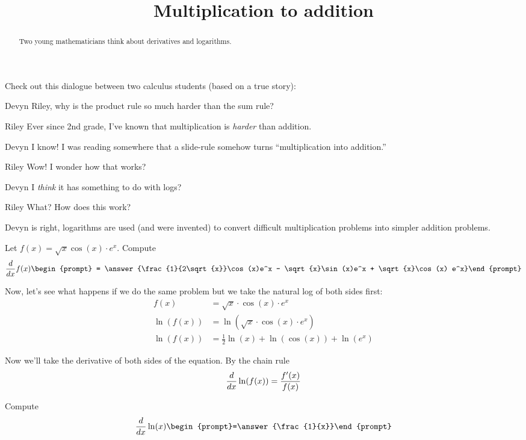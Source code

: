 \documentclass{ximera}
\title[Break-Ground:]{Multiplication to addition}
\begin{document}
\begin{abstract}
Two young mathematicians think about derivatives and logarithms.
\end{abstract}
\maketitle


Check out this dialogue between two calculus students (based on a true
story):

\begin{dialogue}
\item[Devyn] Riley, why is the product rule so much harder than the sum rule?
\item[Riley] Ever since 2nd grade, I've known that multiplication is
  \textit{harder} than addition.
\item[Devyn] I know! I was reading somewhere that a slide-rule somehow
  turns ``multiplication into addition.''
\item[Riley] Wow! I wonder how that works?
\item[Devyn] I \textit{think} it has something to do with logs?
\item[Riley] What? How does this work?
\end{dialogue}

Devyn is right, logarithms are used (and were invented) to convert
difficult multiplication problems into simpler addition problems.

\begin{problem}
  Let $f(x) =  \sqrt{x} \cos(x) \cdot e^x$. Compute
  \[
  \ddx f(x)\begin{prompt} = \answer{\frac{1}{2\sqrt{x}}\cos(x)e^x -  \sqrt{x}\sin(x)e^x +  \sqrt{x}\cos(x) e^x}\end{prompt}
  \]
\end{problem}

Now, let's see what happens if we do the same problem but we take the
natural log of both sides first:
\begin{align*}
  f(x) &= \sqrt{x}\cdot\cos(x)\cdot e^x\\
  \ln(f(x)) &= \ln( \sqrt{x}\cdot\cos(x)\cdot e^x)\\
  \ln(f(x)) &=\frac{1}{2}\ln{(x)} + \ln(\cos(x)) + \ln(e^x)
\end{align*}

Now we'll take the derivative of both sides of the equation.
By the chain rule
\[
\frac{d}{\mathop{}\!d x} \ln(f(x))= \frac{f'(x)}{f(x)}
\]


\begin{problem}
  Compute %
  \[
  \ddx \ln(x)  \begin{prompt}=\answer{\frac{1}{x}}\end{prompt}
  \]
\end{problem}
\end{document}
